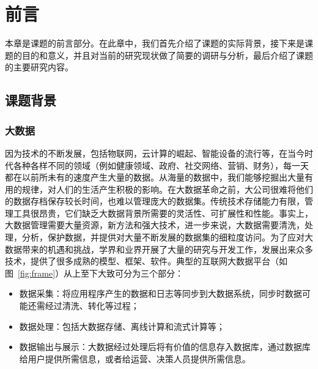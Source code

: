 
\chapter{前言}
\label{chp:intro}

本章是课题的前言部分。在此章中，我们首先介绍了课题的实际背景，接下来是课题的目的和意义，并且对当前的研究现状做了简要的调研与分析，最后介绍了课题的主要研究内容。

\section{课题背景}

\subsection{大数据}

\par 因为技术的不断发展，包括物联网，云计算的崛起\cite{botta2016integration}、智能设备的流行等，在当今时代各种各样不同的领域（例如健康领域、政府、社交网络、营销、财务），每一天都在以前所未有的速度产生大量的数据\cite{oussous2018big}。从海量的数据中，我们能够挖掘出大量有用的规律，对人们的生活产生积极的影响。在大数据革命之前，大公司很难将他们的数据存档保存较长时间，也难以管理庞大的数据集。传统技术存储能力有限，管理工具很昂贵，它们缺乏大数据背景所需要的灵活性、可扩展性和性能。事实上，大数据管理需要大量资源，新方法和强大技术，进一步来说，大数据需要清洗，处理，分析，保护数据，并提供对大量不断发展的数据集的细粒度访问\cite{oussous2018big}。为了应对大数据带来的机遇和挑战，学界和业界开展了大量的研究与开发工作，发展出来众多技术，提供了很多成熟的模型、框架、软件。典型的互联网大数据平台（如图~\ref{fig:frame}）从上至下大致可分为三个部分：

\begin{itemize}
	\item 数据采集：将应用程序产生的数据和日志等同步到大数据系统，同步时数据可能还需经过清洗、转化等过程；
	\item 数据处理：包括大数据存储、离线计算和流式计算等；
	\item 数据输出与展示：大数据经过处理后将有价值的信息存入数据库，通过数据库给用户提供所需信息，或者给运营、决策人员提供所需信息。
\end{itemize}

